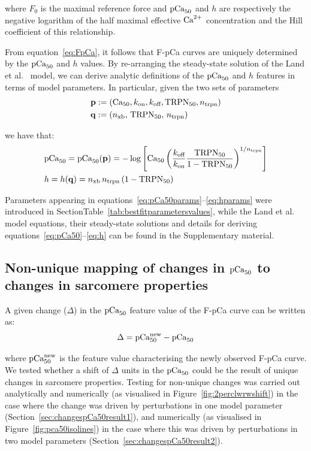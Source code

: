 \noindent
where $F_{0}$ is the maximal reference force and $\textrm{pCa}_{50}$ and $h$ are respectively the negative logarithm of the half maximal effective $\textrm{Ca}^{2+}$ concentration and the Hill coefficient of this relationship.

\vspace{0.2cm}
From equation~\eqref{eq:FpCa}, it follows that F-pCa curves are uniquely determined by the $\textrm{pCa}_{50}$ and $h$ values. By re-arranging the steady-state solution of the Land et al.~\cite{Land:2012} model, we can derive analytic definitions of the $\textrm{pCa}_{50}$ and $h$ features in terms of model parameters. In particular, given the two sets of parameters
%
\begin{align}
    & \mathbf{p} := (\textrm{Ca}_{50}, k_{\textrm{on}}, k_{\textrm{off}}, \textrm{TRPN}_{50}, n_{\textrm{trpn}}) \label{eq:pCa50params} \\
    & \mathbf{q} := (n_{\textrm{xb}},\,\textrm{TRPN}_{50},\,n_{\textrm{trpn}}) \label{eq:hparams}
\end{align}

we have that:
%
\begin{align}
    & \textrm{pCa}_{50} = \textrm{pCa}_{50}(\mathbf{p}) =  -\log\left[\textrm{Ca}_{50}\left(\frac{k_{\textrm{off}}}{k_{\textrm{on}}}\frac{\textrm{TRPN}_{50}}{1-\textrm{TRPN}_{50}}\right)^{1/n_{\textrm{trpn}}}\right] \label{eq:pCa50} \\
    & h = h(\mathbf{q}) = n_{\textrm{xb}}\,n_{\textrm{trpn}}\,(1-\textrm{TRPN}_{50}) \label{eq:h}
\end{align}

Parameters appearing in equations~\eqref{eq:pCa50params}--\eqref{eq:hparams} were introduced in SectionTable~\ref{tab:bestfitparametersvalues}, while the Land et al.~\cite{Land:2012} model equations, their steady-state solutions and details for deriving equations~\eqref{eq:pCa50}--\eqref{eq:h} can be found in the Supplementary material.


%
%
%
\subsection{Non-unique mapping of changes in $\textrm{pCa}_{50}$ to changes in sarcomere properties}\label{sec:changespCa50}
A given change ($\Delta$) in the $\textrm{pCa}_{50}$ feature value of the F-pCa curve can be written as:
%
\begin{equation}\label{eq:delta}
    \Delta = \textrm{pCa}_{50}^{\text{new}} - \textrm{pCa}_{50}
\end{equation}

\vspace{0.2cm}
where $\textrm{pCa}_{50}^{\text{new}}$ is the feature value characterising the newly observed F-pCa curve. We tested whether a shift of $\Delta$ units in the $\textrm{pCa}_{50}$ could be the result of unique changes in sarcomere properties. Testing for non-unique changes was carried out analytically and numerically (as visualised in Figure~\ref{fig:2perclwrwshift}) in the case where the change was driven by perturbations in one model parameter (Section~\ref{sec:changespCa50result1}), and numerically (as visualised in Figure~\ref{fig:pca50isolines}) in the case where this was driven by perturbations in two model parameters (Section~\ref{sec:changespCa50result2}).

